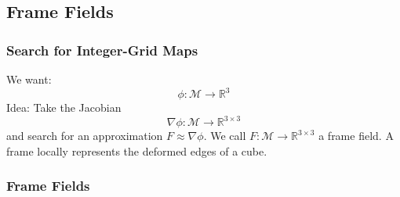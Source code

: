 \documentclass[
	11pt, %
	aspectratio=169, %
]{beamer}
\begin{document}

\subsection{Frame Fields}
\begin{frame}
	\frametitle{Search for Integer-Grid Maps}
	We want:
	$$\phi : \mathcal{M} \to \mathbb{R}^3$$
	Idea: Take the Jacobian
	$$\nabla \phi : \mathcal{M} \to \mathbb{R}^{3\times3}$$
	and search for an approximation $F \approx \nabla \phi$. We call $F : \mathcal{M} \to \mathbb{R}^{3\times3}$ a \alert{frame field}.
	A \alert{frame} locally represents the deformed edges of a cube.
\end{frame}

\begin{frame}
	\frametitle{Frame Fields}
	\begin{columns}[c] %
	

\end{columns}
\end{frame}
\end{document}
